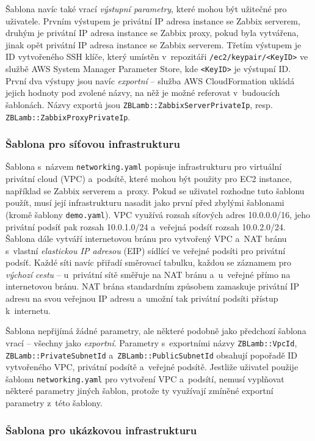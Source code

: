 \documentclass[czech, ing, kiv, he, iso690]{fasthesis}
\begin{document}
Šablona navíc také vrací \emph{výstupní parametry}, které mohou být užitečné pro uživatele. Prvním výstupem je privátní IP adresa instance se Zabbix serverem, druhým je privátní IP adresa instance se Zabbix proxy, pokud byla vytvářena, jinak opět privátní IP adresa instance se Zabbix serverem. Třetím výstupem je ID vytvořeného SSH klíče, který umístěn v~repozitáři \verb|/ec2/keypair/<KeyID>| ve službě AWS System Manager Parameter Store, kde \verb|<KeyID>| je výstupní ID. První dva výstupy jsou navíc \emph{exportní} -- služba AWS CloudFormation ukládá jejich hodnoty pod zvolené názvy, na něž je možné referovat v~budoucích šablonách. Názvy exportů jsou \verb|ZBLamb::ZabbixServerPrivateIp|, resp. \verb|ZBLamb::ZabbixProxyPrivateIp|. 

\subsubsection{Šablona pro síťovou infrastrukturu}

Šablona s~názvem \verb|networking.yaml| popisuje infrastrukturu pro virtuální privátní cloud (VPC) a~podsítě, které mohou být použity pro EC2 instance, například se Zabbix serverem a~proxy. Pokud se uživatel rozhodne tuto šablonu použít, musí její infrastrukturu nasadit jako první před zbylými šablonami (kromě šablony \verb|demo.yaml|). VPC využívá rozsah síťových adres 10.0.0.0/16, jeho privátní podsíť pak rozsah 10.0.1.0/24 a~veřejná podsíť rozsah 10.0.2.0/24. Šablona dále vytváří internetovou bránu pro vytvořený VPC a~NAT bránu s~vlastní \emph{elastickou IP adresou} (EIP) sídlící ve veřejné podsíti pro privátní podsíť. Každé síti navíc přiřadí směrovací tabulku, každou se záznamem pro \emph{výchozí cestu} -- u~privátní sítě směřuje na NAT bránu a~u~veřejné přímo na internetovou bránu. NAT brána standardním způsobem zamaskuje privátní IP adresu na svou veřejnou IP adresu a~umožní tak privátní podsíti přístup k~internetu. 

Šablona nepřijímá žádné parametry, ale některé podobně jako předchozí šablona vrací -- všechny jako \emph{exportní}. Parametry s~exportními názvy \verb|ZBLamb::VpcId|, \verb|ZBLamb::PrivateSubnetId| a~\verb|ZBLamb::PublicSubnetId| obsahují popořadě ID vytvořeného VPC, privátní podsítě a~veřejné podsítě. Jestliže uživatel použije šablonu \verb|networking.yaml| pro vytvoření VPC a~podsítí, nemusí vyplňovat některé parametry jiných šablon, protože ty využívají zmíněné exportní parametry z~této šablony.

\subsubsection{Šablona pro ukázkovou infrastrukturu}
\end{document}

